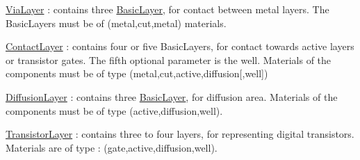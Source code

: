 \begin{DoxyItemize}
\begin{DoxyItemize}
\item \hyperlink{classHurricane_1_1ViaLayer}{Via\-Layer} \-: contains three \hyperlink{classHurricane_1_1BasicLayer}{Basic\-Layer}, for contact between metal layers. The Basic\-Layers must be of {\ttfamily }(metal,cut,metal) materials. 
\item \hyperlink{classHurricane_1_1ContactLayer}{Contact\-Layer} \-: contains four or five Basic\-Layers, for contact towards active layers or transistor gates. The fifth optional parameter is the well. Materials of the components must be of type {\ttfamily }(metal,cut,active,diffusion\mbox{[},well\mbox{]}) 
\item \hyperlink{classHurricane_1_1DiffusionLayer}{Diffusion\-Layer} \-: contains three \hyperlink{classHurricane_1_1BasicLayer}{Basic\-Layer}, for diffusion area. Materials of the components must be of type {\ttfamily }(active,diffusion,well). 
\item \hyperlink{classHurricane_1_1TransistorLayer}{Transistor\-Layer} \-: contains three to four layers, for representing digital transistors. Materials are of type \-: {\ttfamily }(gate,active,diffusion,well). 
\end{DoxyItemize}
\end{DoxyItemize}

